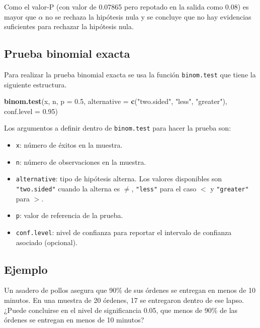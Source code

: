 \documentclass[10pt,]{krantz}
\makeatletter
\newenvironment{Shaded}{\begin{snugshade}}{\end{snugshade}}
\newcommand{\KeywordTok}[1]{\textcolor[rgb]{0.13,0.29,0.53}{\textbf{#1}}}
\newcommand{\DataTypeTok}[1]{\textcolor[rgb]{0.13,0.29,0.53}{#1}}
\newcommand{\FloatTok}[1]{\textcolor[rgb]{0.00,0.00,0.81}{#1}}
\newcommand{\StringTok}[1]{\textcolor[rgb]{0.31,0.60,0.02}{#1}}
\newcommand{\NormalTok}[1]{#1}
\providecommand{\tightlist}{%
  \setlength{\itemsep}{0pt}\setlength{\parskip}{0pt}}
\newenvironment{kframe}{%
\medskip{}
\setlength{\fboxsep}{.8em}
 \def\at@end@of@kframe{}%
 \ifinner\ifhmode%
  \def\at@end@of@kframe{\end{minipage}}%
  \begin{minipage}{\columnwidth}%
 \fi\fi%
 \def\FrameCommand##1{\hskip\@totalleftmargin \hskip-\fboxsep
 \colorbox{shadecolor}{##1}\hskip-\fboxsep
     \hskip-\linewidth \hskip-\@totalleftmargin \hskip\columnwidth}%
 \MakeFramed {\advance\hsize-\width
   \@totalleftmargin\z@ \linewidth\hsize
   \@setminipage}}%
 {\par\unskip\endMakeFramed%
 \at@end@of@kframe}
\renewenvironment{Shaded}{\begin{kframe}}{\end{kframe}}
\makeatother
\begin{document}
Como el valor-P (con valor de 0.07865 pero repotado en la salida como
0.08) es mayor que \(\alpha\) no se rechaza la hipótesis nula y se
concluye que no hay evidencias suficientes para rechazar la hipótesis
nula.

\subsection{Prueba binomial exacta}\label{prueba-binomial-exacta}

Para realizar la prueba binomial exacta se usa la función
\texttt{binom.test} que tiene la siguiente estructura.

\begin{Shaded}
\begin{Highlighting}[]
\KeywordTok{binom.test}\NormalTok{(x, n, }\DataTypeTok{p =} \FloatTok{0.5}\NormalTok{,}
           \DataTypeTok{alternative =} \KeywordTok{c}\NormalTok{(}\StringTok{"two.sided"}\NormalTok{, }\StringTok{"less"}\NormalTok{, }\StringTok{"greater"}\NormalTok{),}
           \DataTypeTok{conf.level =} \FloatTok{0.95}\NormalTok{)}
\end{Highlighting}
\end{Shaded}

Los argumentos a definir dentro de \texttt{binom.test} para hacer la
prueba son:

\begin{itemize}
\tightlist
\item
  \texttt{x}: número de éxitos en la muestra.
\item
  \texttt{n}: número de observaciones en la muestra.
\item
  \texttt{alternative}: tipo de hipótesis alterna. Los valores
  disponibles son \texttt{"two.sided"} cuando la alterna es \(\neq\),
  \texttt{"less"} para el caso \(<\) y \texttt{"greater"} para \(>\).
\item
  \texttt{p}: valor de referencia de la prueba.
\item
  \texttt{conf.level}: nivel de confianza para reportar el intervalo de
  confianza asociado (opcional).
\end{itemize}

\subsection*{Ejemplo}\label{ejemplo-66}


Un asadero de pollos asegura que 90\% de sus órdenes se entregan en
menos de 10 minutos. En una muestra de 20 órdenes, 17 se entregaron
dentro de ese lapso. ¿Puede concluirse en el nivel de significancia
0.05, que menos de 90\% de las órdenes se entregan en menos de 10
minutos?
\end{document}

